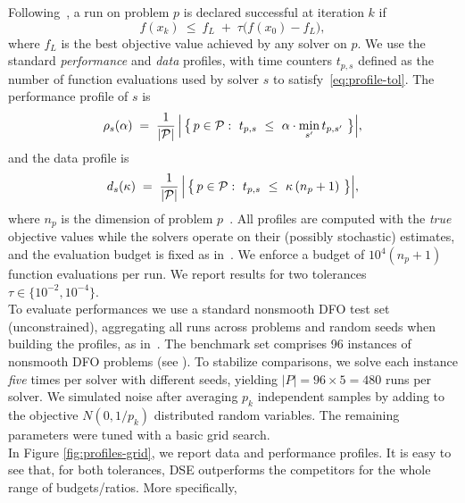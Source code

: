 \documentclass[11pt,a4paper]{article}
\begin{document}
Following~\cite{more2009benchmarking}, a run on problem $p$ is declared successful at
iteration $k$ if
\begin{equation}\label{eq:profile-tol}
  f(x_k)\ \le\ f_L\;+\;\tau\bigl(f(x_0)-f_L\bigr),
\end{equation}
where $f_L$ is the best objective value achieved by any solver on $p$.
We use the standard \emph{performance} and \emph{data} profiles,
with time counters $t_{p,s}$ defined as the number of function evaluations used by solver $s$
to satisfy~\eqref{eq:profile-tol}. The performance profile of $s$ is
\[
\rho_s(\alpha)\;=\;\frac{1}{|{\mathcal P}|}\,
\Bigl|\,\bigl\{\,p\in{\mathcal P}:\ 
t_{p,s}\ \le\ \alpha\cdot \min_{s'} t_{p,s'}\ \bigr\}\Bigr|,
\]
and the data profile is
\[
d_s(\kappa)\;=\;\frac{1}{|{\mathcal P}|}\,
\Bigl|\,\bigl\{\,p\in{\mathcal P}:\  t_{p,s}\ \le\ \kappa\,(n_p+1)\ \bigr\}\Bigr|,
\]
where $n_p$ is the dimension of problem $p$~\cite[Section~5]{MR4758401}.
All profiles are computed with the \emph{true} objective values while the solvers operate on their (possibly stochastic) estimates, and the evaluation budget is fixed  as in~\cite[Section 5]{MR4758401}.
We enforce a budget of $10^4(n_p+1)$ function evaluations per run.
We report results for two tolerances $\tau\in\{10^{-2},10^{-4}\}$.\\
To evaluate performances we use a standard nonsmooth DFO test set (unconstrained), aggregating all runs across problems and random seeds when building the profiles, as in~\cite[Section~5]{MR4758401}. The benchmark set comprises 96 instances of nonsmooth DFO problems (see \cite[Table 1]{MR4758401}). To stabilize comparisons, we solve each instance \emph{five} times per solver with different seeds, yielding $|P|=96 \times 5 = 480$ runs per solver.  
We simulated noise after averaging $p_k$ independent samples by adding to the objective $N(0, 1/p_k)$ distributed random variables. The remaining parameters were tuned with a basic grid search.\\
In Figure \ref{fig:profiles-grid}, we report data and performance profiles. It is easy to see that, for both tolerances, DSE outperforms the competitors for the whole range of budgets/ratios. More specifically, 
\end{document}
